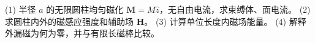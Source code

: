 (1) 半径 \(a\) 的无限圆柱均匀磁化 \(\mathbf M=M\hat z\)，无自由电流，求束缚体、面电流。
(2) 求圆柱内外的磁感应强度和辅助场 \(\mathbf H\)。
(3) 计算单位长度内磁场能量。
(4) 解释外漏磁为何为零，并与有限长磁棒比较。
